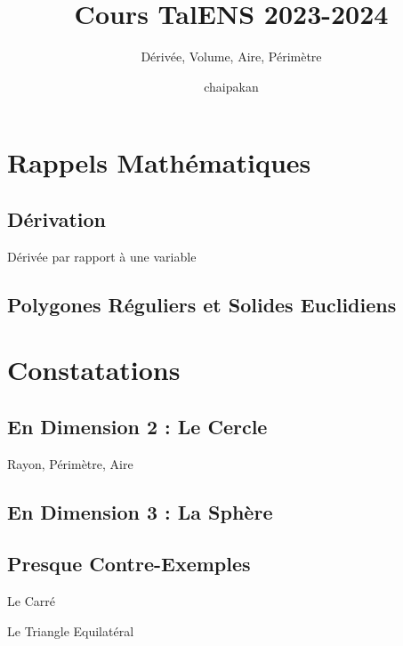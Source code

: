 \documentclass{beamercours}
\title{Cours TalENS 2023-2024}
\subtitle{Dérivée, Volume, Aire, Périmètre}
\date{chaipakan}
\begin{document}
\maketitle

    \section{Rappels Mathématiques}
        \subsection{Dérivation}
            \begin{frame}{Dérivée par rapport à une variable}
                
            \end{frame}

        \subsection{Polygones Réguliers et Solides Euclidiens}

    \section{Constatations}
        \subsection{En Dimension 2 : Le Cercle}
            \begin{frame}{Rayon, Périmètre, Aire}

            \end{frame}

        \subsection{En Dimension 3 : La Sphère}

        \subsection{Presque Contre-Exemples}
            \begin{frame}{Le Carré}
                
            \end{frame}

            \begin{frame}{Le Triangle Equilatéral}
                
            \end{frame}
\end{document}

